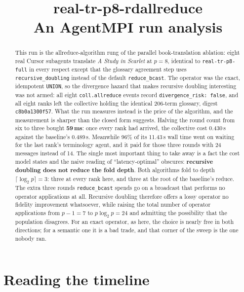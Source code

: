 \documentclass[11pt]{article}
\title{\textbf{real-tr-p8-rdallreduce}\\[2pt]\large An AgentMPI run analysis}
\author{}
\date{}
\begin{document}
\maketitle

\begin{abstract}
This run is the allreduce-algorithm rung of the parallel book-translation ablation: eight real
Cursor subagents translate \emph{A Study in Scarlet} at $p=8$, identical to
\texttt{real-tr-p8-full} in every respect except that the glossary agreement step uses
\texttt{recursive\_doubling} instead of the default \texttt{reduce\_bcast}. The operator was the
exact, idempotent \texttt{UNION}, so the divergence hazard that makes recursive doubling
interesting was not armed: all eight \texttt{coll.allreduce} events record
\texttt{divergence\_risk: false}, and all eight ranks left the collective holding the identical
206-term glossary, digest \texttt{c8b0a1300f57}. What the run measures instead is the price of the
algorithm, and the measurement is sharper than the closed form suggests. Halving the round count
from six to three bought \textbf{59\,ms}: once every rank had arrived, the collective cost 0.430\,s
against the baseline's 0.489\,s. Meanwhile 96\% of its 11.43\,s wall time went on waiting for the
last rank's terminology agent, and it paid for those three rounds with 24 messages instead of 14. The
single most important thing to take away is a fact the cost model states and the naive reading of
``latency-optimal'' obscures: \textbf{recursive doubling does not reduce the fold depth}. Both
algorithms fold to depth $\lceil \log_2 p\rceil = 3$: three at every rank here, and three at the
root of the baseline's reduce. The extra three rounds \texttt{reduce\_bcast} spends go on a
broadcast that performs no operator applications at all. Recursive doubling therefore offers a lossy operator no fidelity improvement
whatsoever, while raising the total number of operator applications from $p-1=7$ to
$p\log_2 p=24$ and admitting the possibility that the population disagrees. For an exact operator,
as here, the choice is nearly free in both directions; for a semantic one it is a bad trade, and
that corner of the sweep is the one nobody ran.
\end{abstract}



\section{Reading the timeline}
\end{document}
